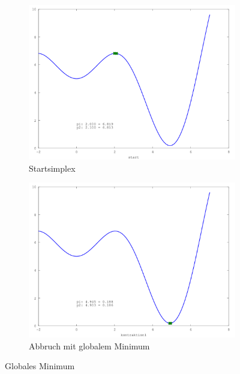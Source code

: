 \begin{figure}[htb]
\centering
\begin{subfigure}[b]{0.49\textwidth}
\centering
\includegraphics[width=\textwidth]{downhill/glob_sinx_x001.png}
\caption{Startsimplex}
\end{subfigure} \begin{subfigure}[b]{0.49\textwidth}
\centering
\includegraphics[width=\textwidth]{downhill/glob_sinx_x010.png}
\caption{Abbruch mit globalem Minimum}
\end{subfigure}
\caption{Globales Minimum}
\label{fig:downhillGlobMinima}
\end{figure}


